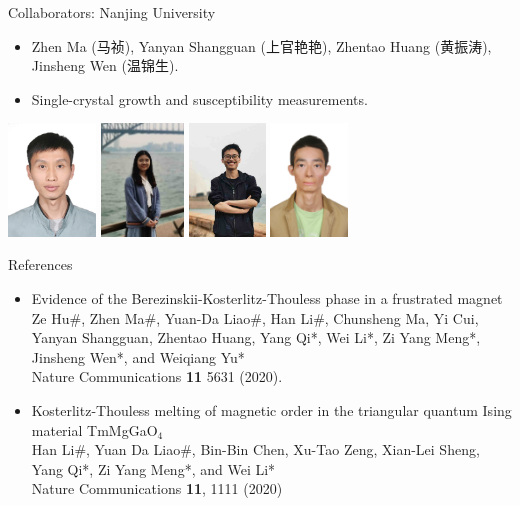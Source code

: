 \documentclass[xcolor=table, aspectratio=1610,ignorenonframetext]{beamer}
\begin{document}
\begin{frame}{Collaborators: Nanjing University}
\begin{itemize}
	\item Zhen Ma (马祯), Yanyan Shangguan (上官艳艳), Zhentao Huang (黄振涛), Jinsheng Wen (温锦生).
	\item Single-crystal growth and susceptibility measurements.
\end{itemize}
	\begin{center}
		\includegraphics[height=3cm]{../people/zhenma}
		\includegraphics[height=3cm]{../people/yanyanshangguan}
		\includegraphics[height=3cm]{../people/zhentaohuang}
		\includegraphics[height=3cm]{../people/jinshengwen}
	\end{center}
\end{frame}

\begin{frame}{References}
\begin{itemize}
	\item Evidence of the Berezinskii-Kosterlitz-Thouless phase in a frustrated magnet\\
Ze Hu\#, Zhen Ma\#, Yuan-Da Liao\#, Han Li\#, Chunsheng Ma, Yi Cui, Yanyan Shangguan, Zhentao Huang, Yang Qi*, Wei Li*, Zi Yang Meng*, Jinsheng Wen*, and Weiqiang Yu*\\
Nature Communications \textbf{11} 5631 (2020).
	\item Kosterlitz-Thouless melting of magnetic order in the triangular quantum Ising material TmMgGaO${}_4$\\
Han Li\#, Yuan Da Liao\#, Bin-Bin Chen, Xu-Tao Zeng, Xian-Lei Sheng, Yang Qi*, Zi Yang Meng*, and Wei Li*\\
Nature Communications \textbf{11}, 1111 (2020)
\end{itemize}
\end{frame}
\end{document}
